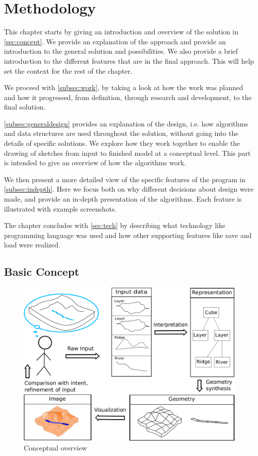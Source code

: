 \documentclass[a4paper,12pt]{report}
\newcommand{\secref}[1]{\autoref{#1}}
\begin{document}
\clearpage


\chapter{Methodology}
\label{sec:method}
This chapter starts by giving an introduction and overview of the solution in \secref{sec:concept}. We provide an explanation of the approach and provide an introduction to the general solution and possibilities. We also provide a brief introduction to the different features  that are in the final approach. This will help set the context for the rest of the chapter.

We proceed with \secref{subsec:work}, by taking a look at how the work was planned and how it progressed, from definition, through research and development, to the final solution. 

\secref{subsec:generaldesign} provides an explanation of the design, i.e. how algorithms and data structures are used throughout the solution, without going into the details of specific solutions. We explore how they work together to enable the drawing of sketches from input to finished model at a conceptual level. This part is intended to give an overview of how the algorithms work.

 We then present a more detailed view of the specific features of the program in \secref{subsec:indepth}. Here we focus both on why different decisions about design were made, and provide an in-depth presentation of the algorithms. Each feature is illustrated with example screenshots.

The chapter concludes with \secref{sec:tech} by describing what technology like programming language was used and how other supporting features like save and load were realized.

\pagebreak

\section{Basic Concept}
\label{sec:concept}

\begin{figure}[h]
 \includegraphics[width=\linewidth]{thesis/overviewConcept.pdf}
 \caption{Conceptual overview}
 \label{fig:overviewConcept}
\end{figure}
\end{document}
